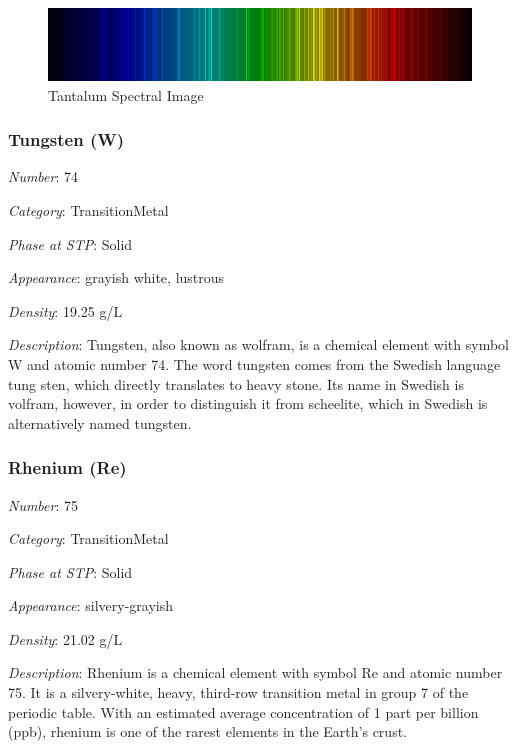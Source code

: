 \documentclass{article}
\begin{document}
\immediate{}
\begin{figure}[!ht]
    \centering
    \includegraphics[width=12cm]{./resources/spectral_img/Tantalum_spectrum_visible.png}
    \caption{Tantalum Spectral Image}
\end{figure}

\hypertarget{subsubsection::W}{}\subsubsection{Tungsten (W)}

\textit{Number}: 74

\textit{Category}: TransitionMetal

\textit{Phase at STP}: Solid

\textit{Appearance}: grayish white, lustrous

\textit{Density}: 19.25 g/L

\textit{Description}: Tungsten, also known as wolfram, is a chemical element with symbol W and atomic number 74. The word tungsten comes from the Swedish language tung sten, which directly translates to heavy stone. Its name in Swedish is volfram, however, in order to distinguish it from scheelite, which in Swedish is alternatively named tungsten.

\hypertarget{subsubsection::Re}{}\subsubsection{Rhenium (Re)}

\textit{Number}: 75

\textit{Category}: TransitionMetal

\textit{Phase at STP}: Solid

\textit{Appearance}: silvery-grayish

\textit{Density}: 21.02 g/L

\textit{Description}: Rhenium is a chemical element with symbol Re and atomic number 75. It is a silvery-white, heavy, third-row transition metal in group 7 of the periodic table. With an estimated average concentration of 1 part per billion (ppb), rhenium is one of the rarest elements in the Earth's crust.
\end{document}
